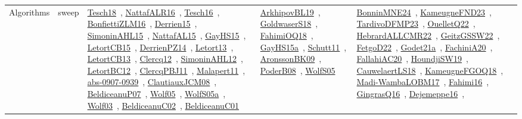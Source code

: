 {\begin{longtable}{lp{3cm}>{\raggedright\arraybackslash}p{6cm}>{\raggedright\arraybackslash}p{6cm}>{\raggedright\arraybackslash}p{8cm}}
Algorithms & sweep & \href{../works/Tesch18.pdf}{Tesch18}~\cite{Tesch18}, \href{../works/NattafALR16.pdf}{NattafALR16}~\cite{NattafALR16}, \href{../works/Tesch16.pdf}{Tesch16}~\cite{Tesch16}, \href{../works/BonfiettiZLM16.pdf}{BonfiettiZLM16}~\cite{BonfiettiZLM16}, \href{../works/Derrien15.pdf}{Derrien15}~\cite{Derrien15}, \href{../works/SimoninAHL15.pdf}{SimoninAHL15}~\cite{SimoninAHL15}, \href{../works/NattafAL15.pdf}{NattafAL15}~\cite{NattafAL15}, \href{../works/GayHS15.pdf}{GayHS15}~\cite{GayHS15}, \href{../works/LetortCB15.pdf}{LetortCB15}~\cite{LetortCB15}, \href{../works/DerrienPZ14.pdf}{DerrienPZ14}~\cite{DerrienPZ14}, \href{../works/Letort13.pdf}{Letort13}~\cite{Letort13}, \href{../works/LetortCB13.pdf}{LetortCB13}~\cite{LetortCB13}, \href{../works/Clercq12.pdf}{Clercq12}~\cite{Clercq12}, \href{../works/SimoninAHL12.pdf}{SimoninAHL12}~\cite{SimoninAHL12}, \href{../works/LetortBC12.pdf}{LetortBC12}~\cite{LetortBC12}, \href{../works/ClercqPBJ11.pdf}{ClercqPBJ11}~\cite{ClercqPBJ11}, \href{../works/Malapert11.pdf}{Malapert11}~\cite{Malapert11}, \href{../works/abs-0907-0939.pdf}{abs-0907-0939}~\cite{abs-0907-0939}, \href{../works/ClautiauxJCM08.pdf}{ClautiauxJCM08}~\cite{ClautiauxJCM08}, \href{../works/BeldiceanuP07.pdf}{BeldiceanuP07}~\cite{BeldiceanuP07}, \href{../works/Wolf05.pdf}{Wolf05}~\cite{Wolf05}, \href{../works/WolfS05a.pdf}{WolfS05a}~\cite{WolfS05a}, \href{../works/Wolf03.pdf}{Wolf03}~\cite{Wolf03}, \href{../works/BeldiceanuC02.pdf}{BeldiceanuC02}~\cite{BeldiceanuC02}, \href{../works/BeldiceanuC01.pdf}{BeldiceanuC01}~\cite{BeldiceanuC01} & \href{../works/ArkhipovBL19.pdf}{ArkhipovBL19}~\cite{ArkhipovBL19}, \href{../works/GoldwaserS18.pdf}{GoldwaserS18}~\cite{GoldwaserS18}, \href{../works/FahimiOQ18.pdf}{FahimiOQ18}~\cite{FahimiOQ18}, \href{../works/GayHS15a.pdf}{GayHS15a}~\cite{GayHS15a}, \href{../works/Schutt11.pdf}{Schutt11}~\cite{Schutt11}, \href{../works/AronssonBK09.pdf}{AronssonBK09}~\cite{AronssonBK09}, \href{../works/PoderB08.pdf}{PoderB08}~\cite{PoderB08}, \href{../works/WolfS05.pdf}{WolfS05}~\cite{WolfS05} & \href{../works/BonninMNE24.pdf}{BonninMNE24}~\cite{BonninMNE24}, \href{../works/KameugneFND23.pdf}{KameugneFND23}~\cite{KameugneFND23}, \href{../works/TardivoDFMP23.pdf}{TardivoDFMP23}~\cite{TardivoDFMP23}, \href{../works/OuelletQ22.pdf}{OuelletQ22}~\cite{OuelletQ22}, \href{../works/HebrardALLCMR22.pdf}{HebrardALLCMR22}~\cite{HebrardALLCMR22}, \href{../works/GeitzGSSW22.pdf}{GeitzGSSW22}~\cite{GeitzGSSW22}, \href{../works/FetgoD22.pdf}{FetgoD22}~\cite{FetgoD22}, \href{../works/Godet21a.pdf}{Godet21a}~\cite{Godet21a}, \href{../works/FachiniA20.pdf}{FachiniA20}~\cite{FachiniA20}, \href{../works/FallahiAC20.pdf}{FallahiAC20}~\cite{FallahiAC20}, \href{../works/HoundjiSW19.pdf}{HoundjiSW19}~\cite{HoundjiSW19}, \href{../works/CauwelaertLS18.pdf}{CauwelaertLS18}~\cite{CauwelaertLS18}, \href{../works/KameugneFGOQ18.pdf}{KameugneFGOQ18}~\cite{KameugneFGOQ18}, \href{../works/Madi-WambaLOBM17.pdf}{Madi-WambaLOBM17}~\cite{Madi-WambaLOBM17}, \href{../works/Fahimi16.pdf}{Fahimi16}~\cite{Fahimi16}, \href{../works/GingrasQ16.pdf}{GingrasQ16}~\cite{GingrasQ16}, \href{../works/Dejemeppe16.pdf}{Dejemeppe16}~\cite{Dejemeppe16}, 
\end{longtable}}
